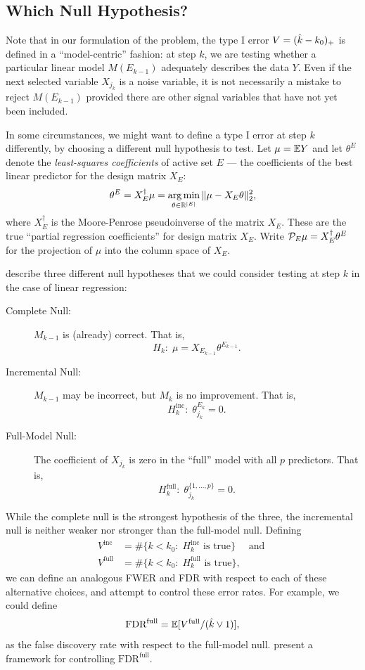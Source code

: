 \documentclass{article}
\begin{document}
\subsection{Which Null Hypothesis?}
\label{sec:whichnull}

Note that in our formulation of the problem, the type I error $V=(\hat{k}-k_0)_+$ is defined in a ``model-centric'' fashion: at step $k$, we are testing  whether a particular linear model $M(E_{k-1})$ adequately describes the data $Y$. Even if the next selected variable $X_{j_k}$ is a noise variable, it is not necessarily a mistake to reject $M(E_{k-1})$ provided there are other signal variables that have not yet been included.

In some circumstances, we might want to define a type I error at step $k$ differently, by choosing a different null hypothesis to test. Let $\mu = \mathbb{E} Y$ and let $\theta^E$ denote the {\em least-squares coefficients} of active set $E$ --- the coefficients of the best linear predictor for the design matrix $X_E$:
\[
\theta^E = X_E^\dagger \mu = \operatorname*{arg\,min}_{\theta\in \mathbb{R}^{|E|}} \|\mu - X_E\theta\|_2^2,
\]
where $X_E^\dagger$ is the Moore-Penrose pseudoinverse of the matrix $X_E$. 
These are the true ``partial regression coefficients''  for design matrix $X_E$.
 Write $\mathcal{P}_E\mu = X_E^\dagger \theta^E$ for the projection of $\mu$ into the column space of $X_E$.

\citet{gsell2013sequential} describe three different null hypotheses that we could consider testing at step $k$ in the case of linear regression:
\begin{description}
\item[Complete Null:] $M_{k-1}$ is (already) correct. That is, 
\[
H_k:\;\mu = X_{E_{k-1}} \theta^{E_{k-1}}.
\]
\item[Incremental Null:] $M_{k-1}$ may be incorrect, but $M_k$ is no improvement. That is, 
\[
H_k^{\text{inc}}:\; \theta_{j_k}^{E_k} = 0.
\]
\item[Full-Model Null:] The coefficient of $X_{j_k}$ is zero in the ``full'' model with all $p$ predictors. That is,
\[
H_k^{\text{full}}:\; \theta_{j_k}^{\{1,\ldots,p\}} = 0.
\]
\end{description}

While the complete null is the strongest hypothesis of the three, the incremental null is neither weaker nor stronger than the full-model null. Defining 
\begin{align}
V^{\text{inc}} &= \#\{k < k_0:\; H_k^{\text{inc}} \text{ is true}\} \quad \text{ and } \\
V^{\text{full}} &= \#\{k < k_0:\; H_k^{\text{full}} \text{ is true}\},
\end{align}
we can define an analogous FWER and FDR with respect to each of these alternative choices, and attempt to control these error rates. For example, we could define
\[
\text{FDR}^{\text{full}} = \mathbb{E}[V^{\text{full}} / (\hat{k} \vee 1)],
\]
as the false discovery rate with respect to the full-model null. \citet{barber2014controlling} present a framework for controlling $\text{FDR}^{\text{full}}$. 
\end{document}
